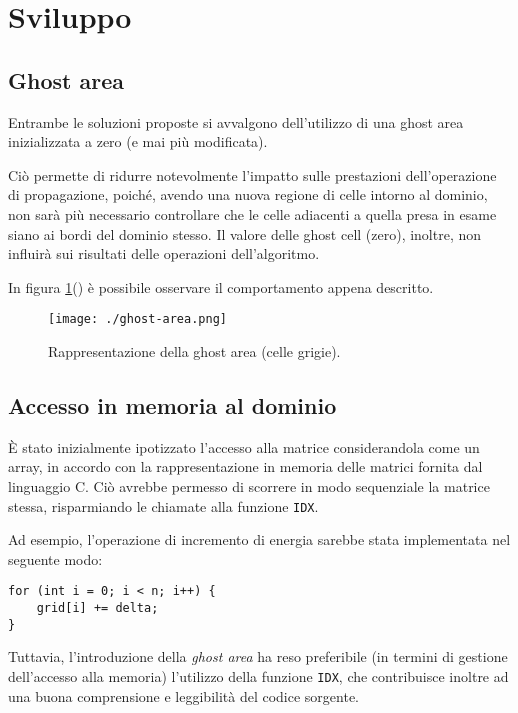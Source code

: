 \section{Sviluppo}

\subsection{Ghost area}

Entrambe le soluzioni proposte si avvalgono dell'utilizzo di una ghost area
inizializzata a zero (e mai più modificata).

Ciò permette di ridurre notevolmente l'impatto sulle prestazioni
dell'operazione di propagazione, poiché, avendo una nuova regione di celle
intorno al dominio, non sarà più necessario controllare che le celle adiacenti a
quella presa in esame siano ai bordi del dominio stesso.
Il valore delle ghost cell (zero), inoltre, non influirà sui risultati delle
operazioni dell'algoritmo.

In figura \ref{fig:ghostarea}(\cite{marzollaghost}) è possibile osservare il comportamento appena
descritto.

\begin{figure}[!ht]
  \centering
  \texttt{[image: ./ghost-area.png]}
  \caption{Rappresentazione della ghost area (celle
  grigie).}\label{fig:ghostarea}
\end{figure}

\subsection{Accesso in memoria al dominio}

È stato inizialmente ipotizzato l'accesso alla matrice considerandola come un
array, in accordo con la rappresentazione in memoria delle matrici fornita dal
linguaggio C.
Ciò avrebbe permesso di scorrere in modo sequenziale la matrice stessa,
risparmiando le chiamate alla funzione \texttt{IDX}.

Ad esempio, l'operazione di incremento di energia sarebbe stata implementata nel
seguente modo:
\begin{verbatim}
for (int i = 0; i < n; i++) {
    grid[i] += delta;
}
\end{verbatim}

Tuttavia, l'introduzione della \textit{ghost area} ha reso preferibile (in
termini di gestione dell'accesso alla memoria) l'utilizzo della funzione
\texttt{IDX}, che contribuisce inoltre ad una buona comprensione e leggibilità
del codice sorgente.

